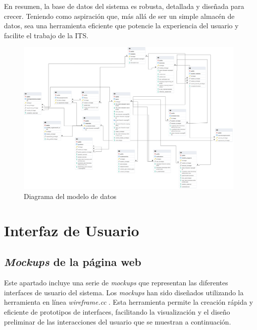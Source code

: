 En resumen, la base de datos del sistema es robusta, detallada y diseñada para crecer. Teniendo como aspiración que, más allá de ser un simple almacén de datos, sea una herramienta eficiente que potencie la experiencia del usuario y facilite el trabajo de la ITS.

\newpage

\begin{figure}[H]
    \centering
    \begin{sideways}
        \includegraphics[width=1.8\textwidth]{imagenes/er.png}
    \end{sideways}
    \caption{Diagrama del modelo de datos}
    \label{fig:modeladodedatos}
\end{figure}

\section{Interfaz de Usuario}

\subsection{\textit{Mockups} de la página web}

Este apartado incluye una serie de \textit{mockups} que representan las diferentes interfaces de usuario del sistema. Los \textit{mockups} han sido diseñados utilizando la herramienta en línea \textit{wireframe.cc} \cite{wireframe}. Esta herramienta permite la creación rápida y eficiente de prototipos de interfaces, facilitando la visualización y el diseño preliminar de las interacciones del usuario que se muestran a continuación.

